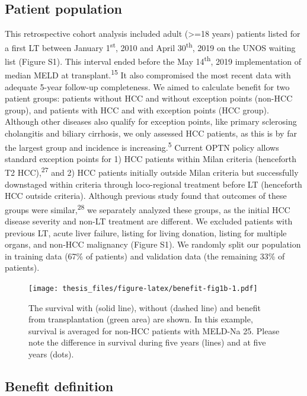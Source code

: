 \documentclass[11pt,english,]{book} %
\begin{document}
\hypertarget{patient-population}{%
\subsection*{Patient population}\label{patient-population}}

This retrospective cohort analysis included adult (\textgreater=18 years) patients listed for a first LT between January 1\textsuperscript{st}, 2010 and April 30\textsuperscript{th}, 2019 on the UNOS waiting list (Figure S1). This interval ended before the May 14\textsuperscript{th}, 2019 implementation of median MELD at transplant.\textsuperscript{15} It also compromised the most recent data with adequate 5-year follow-up completeness. We aimed to calculate benefit for two patient groups: patients without HCC and without exception points (non-HCC group), and patients with HCC and with exception points (HCC group). Although other diseases also qualify for exception points, like primary sclerosing cholangitis and biliary cirrhosis, we only assessed HCC patients, as this is by far the largest group and incidence is increasing.\textsuperscript{5} Current OPTN policy allows standard exception points for 1) HCC patients within Milan criteria (henceforth T2 HCC),\textsuperscript{27} and 2) HCC patients initially outside Milan criteria but successfully downstaged within criteria through loco-regional treatment before LT (henceforth HCC outside criteria). Although previous study found that outcomes of these groups were similar,\textsuperscript{28} we separately analyzed these groups, as the initial HCC disease severity and non-LT treatment are different. We excluded patients with previous LT, acute liver failure, listing for living donation, listing for multiple organs, and non-HCC malignancy (Figure S1). We randomly split our population in training data (67\% of patients) and validation data (the remaining 33\% of patients).

\begin{figure}
\centering
\texttt{[image: thesis\_files/figure-latex/benefit-fig1b-1.pdf]}
\caption{\label{fig:benefit-fig1b}The survival with (solid line), without (dashed line) and benefit from transplantation (green area) are shown. In this example, survival is averaged for non-HCC patients with MELD-Na 25. Please note the difference in survival during five years (lines) and at five years (dots).}
\end{figure}

\hypertarget{benefit-definition}{%
\subsection*{Benefit definition}\label{benefit-definition}}
\end{document}
